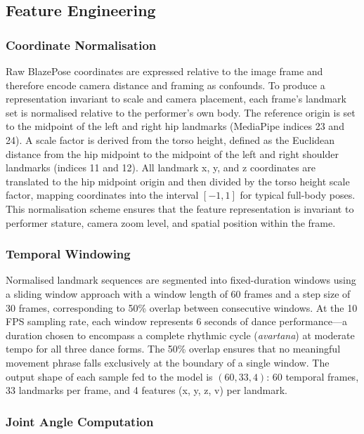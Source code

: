 \documentclass[journal]{IEEEtran}
\begin{document}
\subsection{Feature Engineering}

\subsubsection{Coordinate Normalisation}

Raw BlazePose coordinates are expressed relative to the image frame
and therefore encode camera distance and framing as confounds. To
produce a representation invariant to scale and camera placement, each
frame's landmark set is normalised relative to the performer's own body.
The reference origin is set to the midpoint of the left and right hip
landmarks (MediaPipe indices 23 and 24). A scale factor is derived from
the torso height, defined as the Euclidean distance from the hip
midpoint to the midpoint of the left and right shoulder landmarks
(indices 11 and 12). All landmark x, y, and z coordinates are
translated to the hip midpoint origin and then divided by the torso
height scale factor, mapping coordinates into the interval $[-1, 1]$
for typical full-body poses. This normalisation scheme ensures that
the feature representation is invariant to performer stature,
camera zoom level, and spatial position within the frame.

\subsubsection{Temporal Windowing}

Normalised landmark sequences are segmented into fixed-duration windows
using a sliding window approach with a window length of 60 frames and
a step size of 30 frames, corresponding to 50\% overlap between
consecutive windows. At the 10 FPS sampling rate, each window
represents 6 seconds of dance performance—a duration chosen to encompass
a complete rhythmic cycle (\textit{avartana}) at moderate tempo for all
three dance forms. The 50\% overlap ensures that no meaningful movement
phrase falls exclusively at the boundary of a single window. The output
shape of each sample fed to the model is $(60, 33, 4)$: 60 temporal
frames, 33 landmarks per frame, and 4 features (x, y, z, v) per
landmark.

\subsubsection{Joint Angle Computation}
\end{document}
